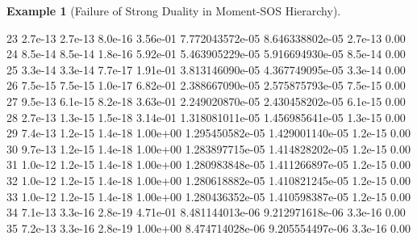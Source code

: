 \documentclass[
]{book}
\newenvironment{Shaded}{\begin{snugshade}}{\end{snugshade}}
\newcommand{\FloatTok}[1]{\textcolor[rgb]{0.00,0.00,0.81}{#1}}
\theoremstyle{definition}
\theoremstyle{definition}
\newtheorem{example}{Example}[chapter]
\theoremstyle{definition}
\theoremstyle{definition}
\theoremstyle{remark}
\begin{document}
\begin{example}[Failure of Strong Duality in Moment-SOS Hierarchy]
\begin{Shaded}
\begin{Highlighting}[]
\FloatTok{23}  \FloatTok{2.7e{-}13}  \FloatTok{2.7e{-}13}  \FloatTok{8.0e{-}16}  \FloatTok{3.56e{-}01}   \FloatTok{7.772043572e{-}05}   \FloatTok{8.646338802e{-}05}   \FloatTok{2.7e{-}13}  \FloatTok{0.00}  
\FloatTok{24}  \FloatTok{8.5e{-}14}  \FloatTok{8.5e{-}14}  \FloatTok{1.8e{-}16}  \FloatTok{5.92e{-}01}   \FloatTok{5.463905229e{-}05}   \FloatTok{5.916694930e{-}05}   \FloatTok{8.5e{-}14}  \FloatTok{0.00}  
\FloatTok{25}  \FloatTok{3.3e{-}14}  \FloatTok{3.3e{-}14}  \FloatTok{7.7e{-}17}  \FloatTok{1.91e{-}01}   \FloatTok{3.813146090e{-}05}   \FloatTok{4.367749095e{-}05}   \FloatTok{3.3e{-}14}  \FloatTok{0.00}  
\FloatTok{26}  \FloatTok{7.5e{-}15}  \FloatTok{7.5e{-}15}  \FloatTok{1.0e{-}17}  \FloatTok{6.82e{-}01}   \FloatTok{2.388667090e{-}05}   \FloatTok{2.575875793e{-}05}   \FloatTok{7.5e{-}15}  \FloatTok{0.00}  
\FloatTok{27}  \FloatTok{9.5e{-}13}  \FloatTok{6.1e{-}15}  \FloatTok{8.2e{-}18}  \FloatTok{3.63e{-}01}   \FloatTok{2.249020870e{-}05}   \FloatTok{2.430458202e{-}05}   \FloatTok{6.1e{-}15}  \FloatTok{0.00}  
\FloatTok{28}  \FloatTok{2.7e{-}13}  \FloatTok{1.3e{-}15}  \FloatTok{1.5e{-}18}  \FloatTok{3.14e{-}01}   \FloatTok{1.318081011e{-}05}   \FloatTok{1.456985641e{-}05}   \FloatTok{1.3e{-}15}  \FloatTok{0.00}  
\FloatTok{29}  \FloatTok{7.4e{-}13}  \FloatTok{1.2e{-}15}  \FloatTok{1.4e{-}18}  \FloatTok{1.00e+00}   \FloatTok{1.295450582e{-}05}   \FloatTok{1.429001140e{-}05}   \FloatTok{1.2e{-}15}  \FloatTok{0.00}  
\FloatTok{30}  \FloatTok{9.7e{-}13}  \FloatTok{1.2e{-}15}  \FloatTok{1.4e{-}18}  \FloatTok{1.00e+00}   \FloatTok{1.283897715e{-}05}   \FloatTok{1.414828202e{-}05}   \FloatTok{1.2e{-}15}  \FloatTok{0.00}  
\FloatTok{31}  \FloatTok{1.0e{-}12}  \FloatTok{1.2e{-}15}  \FloatTok{1.4e{-}18}  \FloatTok{1.00e+00}   \FloatTok{1.280983848e{-}05}   \FloatTok{1.411266897e{-}05}   \FloatTok{1.2e{-}15}  \FloatTok{0.00}  
\FloatTok{32}  \FloatTok{1.0e{-}12}  \FloatTok{1.2e{-}15}  \FloatTok{1.4e{-}18}  \FloatTok{1.00e+00}   \FloatTok{1.280618882e{-}05}   \FloatTok{1.410821245e{-}05}   \FloatTok{1.2e{-}15}  \FloatTok{0.00}  
\FloatTok{33}  \FloatTok{1.0e{-}12}  \FloatTok{1.2e{-}15}  \FloatTok{1.4e{-}18}  \FloatTok{1.00e+00}   \FloatTok{1.280436352e{-}05}   \FloatTok{1.410598387e{-}05}   \FloatTok{1.2e{-}15}  \FloatTok{0.00}  
\FloatTok{34}  \FloatTok{7.1e{-}13}  \FloatTok{3.3e{-}16}  \FloatTok{2.8e{-}19}  \FloatTok{4.71e{-}01}   \FloatTok{8.481144013e{-}06}   \FloatTok{9.212971618e{-}06}   \FloatTok{3.3e{-}16}  \FloatTok{0.00}  
\FloatTok{35}  \FloatTok{7.2e{-}13}  \FloatTok{3.3e{-}16}  \FloatTok{2.8e{-}19}  \FloatTok{1.00e+00}   \FloatTok{8.474714028e{-}06}   \FloatTok{9.205554497e{-}06}   \FloatTok{3.3e{-}16}  \FloatTok{0.00}  

\end{Highlighting}
\end{Shaded}
\end{example}
\end{document}
